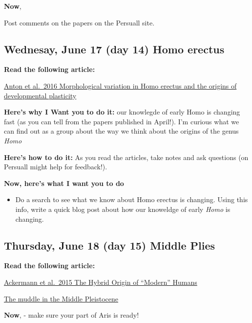 \documentclass[]{tufte-handout}
\providecommand{\tightlist}{%
  \setlength{\itemsep}{0pt}\setlength{\parskip}{0pt}}
\begin{document}
\textbf{Now},

Post comments on the papers on the Persuall site.

\hypertarget{wednesay-june-17-day-14-homo-erectus}{%
\subsection{Wednesay, June 17 (day 14) Homo
erectus}\label{wednesay-june-17-day-14-homo-erectus}}

\textbf{Read the following article:}

\href{https://royalsocietypublishing.org/doi/10.1098/rstb.2015.0236}{Anton
et al.~2016 Morphological variation in Homo erectus and the origins of
developmental plasticity}

\begin{marginfigure}
\textbf{Here's why I Want you to do it:} our knowlegde of early Homo is
changing fast (as you can tell from the papers published in April!). I'm
curious what we can find out as a group about the way we think about the
origins of the genus \emph{Homo}

\textbf{Here's how to do it:} As you read the articles, take notes and
ask questions (on Persuall might help for feedback!).
\end{marginfigure}

\textbf{Now, here's what I want you to do}

\begin{itemize}
\tightlist
\item
  Do a search to see what we know about Homo erectus is changing. Using
  this info, write a quick blog post about how our knoweldge of early
  \emph{Homo} is changing.
\end{itemize}

\hypertarget{thursday-june-18-day-15-middle-plies}{%
\subsection{Thursday, June 18 (day 15) Middle
Plies}\label{thursday-june-18-day-15-middle-plies}}

\textbf{Read the following article:}

\href{https://link.springer.com/article/10.1007/s11692-015-9348-1}{Ackermann
et al.~2015 The Hybrid Origin of ``Modern'' Humans}

\href{https://www.youtube.com/watch?v=C1SsIT6CLYo}{The muddle in the
Middle Pleistocene}

\textbf{Now}, - make sure your part of Aris is ready!
\end{document}

